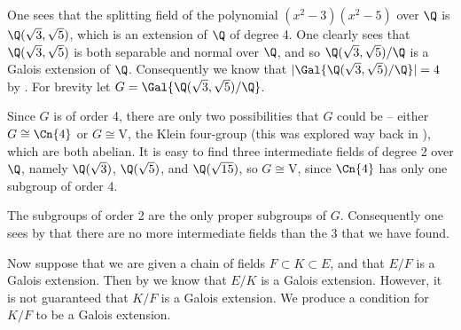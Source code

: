 \begin{example}
    One sees that the splitting field of the polynomial $(x^2 - 3)(x^2 - 5)$ over $\Q$ is $\Q(\sqrt3,\sqrt5)$, which is an extension of $\Q$ of degree 4. One clearly sees that $\Q(\sqrt3,\sqrt5)$ is both separable and normal over $\Q$, and so $\Q(\sqrt3,\sqrt5)/\Q$ is a Galois extension of $\Q$. Consequently we know that $|\Gal{\Q(\sqrt3,\sqrt5)/\Q}| = 4$ by . For brevity let $G = \Gal{\Q(\sqrt3,\sqrt5)/\Q}$.

    Since $G$ is of order 4, there are only two possibilities that $G$ could be -- either $G \cong \Cn{4}$ or $G \cong \mathrm{V}$, the Klein four-group (this was explored way back in ), which are both abelian. It is easy to find three intermediate fields of degree 2 over $\Q$, namely $\Q(\sqrt3)$, $\Q(\sqrt5)$, and $\Q(\sqrt{15})$, so $G \cong \mathrm{V}$, since $\Cn{4}$ has only one subgroup of order 4.

    The subgroups of order 2 are the only proper subgroups of $G$. Consequently one sees by  that there are no more intermediate fields than the 3 that we have found.
\end{example}

Now suppose that we are given a chain of fields $F \subset K \subset E$, and that $E/F$ is a Galois extension. Then by  we know that $E/K$ is a Galois extension. However, it is not guaranteed that $K/F$ is a Galois extension. We produce a condition for $K/F$ to be a Galois extension.

